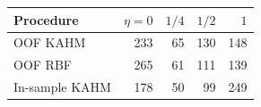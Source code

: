 \begin{tabular}{@{}lrrrr@{}}
\toprule
Procedure & $\eta=0$ & $1/4$ & $1/2$ & $1$ \\
\midrule
OOF KAHM & 233 & 65 & 130 & 148 \\
OOF RBF & 265 & 61 & 111 & 139 \\
In-sample KAHM & 178 & 50 & 99 & 249 \\
\bottomrule
\end{tabular}
